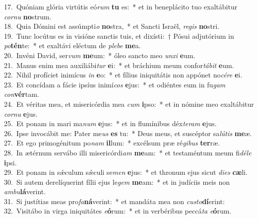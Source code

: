{17.~}Quóniam glória virtútis eó\textit{rum} \textbf{tu} es:~* et in beneplácito tuo exaltábitur \textit{cor}\textit{nu} \textbf{no}strum.\\
{18.~}Quia Dómini est assúmpti\textit{o} \textbf{no}stra,~* et Sancti Israël, \textit{re}\textit{gis} \textbf{no}stri.\\
{19.~}Tunc locútus es in visióne sanctis tuis, et dixísti:~† Pósui adjutórium in \textit{po}\textbf{tén}te:~* et exaltávi eléctum de \textit{ple}\textit{be} \textbf{me}a.\\
{20.~}Invéni David, ser\textit{vum} \textbf{me}um:~* óleo sancto meo \textit{un}\textit{xi} \textbf{e}um.\\
{21.~}Manus enim mea auxiliábi\textit{tur} \textbf{e}i:~* et bráchium meum confor\textit{tá}\textit{bit} \textbf{e}um.\\
{22.~}Nihil profíciet inimícus \textit{in} \textbf{e}o:~* et fílius iniquitátis non appónet no\textit{cé}\textit{re} \textbf{e}i.\\
{23.~}Et concídam a fácie ipsíus inimí\textit{cos} \textbf{e}jus:~* et odiéntes eum in fu\textit{gam} \textit{con}\textbf{vér}tam.\\
{24.~}Et véritas mea, et misericórdia mea \textit{cum} \textbf{i}pso:~* et in nómine meo exaltábitur \textit{cor}\textit{nu} \textbf{e}jus.\\
{25.~}Et ponam in mari ma\textit{num} \textbf{e}jus:~* et in flumínibus déx\textit{te}\textit{ram} \textbf{e}jus.\\
{26.~}Ipse invocábit me: Pater me\textit{us} \textbf{es} tu:~* Deus meus, et suscéptor sa\textit{lú}\textit{tis} \textbf{me}æ.\\
{27.~}Et ego primogénitum po\textit{nam} \textbf{il}lum:~* excélsum præ ré\textit{gi}\textit{bus} \textbf{ter}ræ.\\
{28.~}In ætérnum servábo illi misericórdi\textit{am} \textbf{me}am:~* et testaméntum meum fi\textit{dé}\textit{le} \textbf{i}psi.\\
{29.~}Et ponam in sǽculum sǽculi se\textit{men} \textbf{e}jus:~* et thronum ejus sicut \textit{di}\textit{es} \textbf{cæ}li.\\
{30.~}Si autem derelíquerint fílii ejus le\textit{gem} \textbf{me}am:~* et in judíciis meis non \textit{am}\textit{bu}\textbf{lá}verint.\\
{31.~}Si justítias meas pro\textit{fa}\textbf{ná}verint:~* et mandáta mea non \textit{cu}\textit{sto}\textbf{dí}erint:\\
{32.~}Visitábo in virga iniquitátes \textit{e}\textbf{ó}rum:~* et in verbéribus peccá\textit{ta} \textit{e}\textbf{ó}rum.\\
